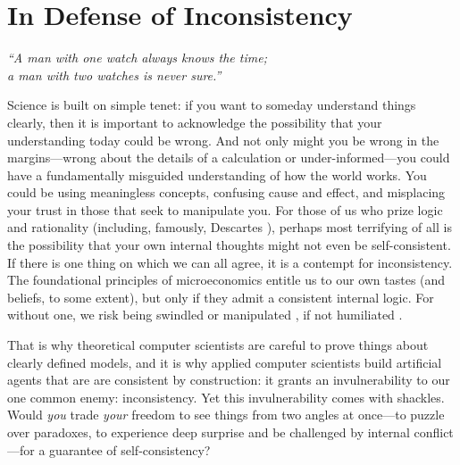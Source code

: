 

\section{In Defense of Inconsistency}

\begin{center}
    \noindent\singlespacingplus
    \it
    ``A man with one watch always knows the time;\\
    a man with two watches is never sure.''
\end{center}

Science is built on simple tenet: if you want to someday understand things clearly, then it is important to acknowledge the possibility that your understanding today could be wrong.
And not only might you be wrong in the margins---wrong about the details of a calculation or under-informed---you could have a fundamentally misguided understanding of how the world works. You could be using meaningless concepts, confusing cause and effect, and misplacing your trust in those that seek to manipulate you. 
For those of us who prize logic and rationality (including, famously, Descartes \cite{descartes}), perhaps most terrifying of all is the possibility that your own internal thoughts might not even be self-consistent.
If there is one thing on which we can all agree, it is a contempt for inconsistency.
The foundational principles of microeconomics entitle us to our own tastes (and beliefs, to some extent), but only if they admit a consistent internal logic.
For without one, we risk being swindled \cite{RAT} or manipulated \cite{explosion}, if not humiliated \cite{logicalfalacy,emptysetthesis,politicians}.

That is why theoretical computer scientists are careful to prove things about clearly defined models,
and it is why applied computer scientists build artificial agents that are are consistent by construction:
  it grants an invulnerability to our one common enemy: inconsistency.
%
Yet this invulnerability comes with shackles.
Would \emph{you} trade \emph{your} freedom to see things from two angles at once---to puzzle over paradoxes, to experience deep surprise and be challenged by internal conflict---for a guarantee of self-consistency?

